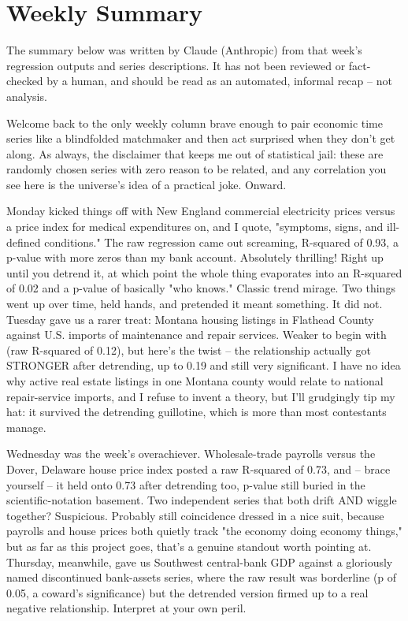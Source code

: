 \section{Weekly Summary}

\begin{tcolorbox}[colback=yellow!10,colframe=black!50,title=AI-Generated Content]
\noindent The summary below was written by Claude (Anthropic) from that week's regression outputs and series descriptions. It has not been reviewed or fact-checked by a human, and should be read as an automated, informal recap -- not analysis.
\end{tcolorbox}

Welcome back to the only weekly column brave enough to pair economic time series like a blindfolded matchmaker and then act surprised when they don't get along. As always, the disclaimer that keeps me out of statistical jail: these are randomly chosen series with zero reason to be related, and any correlation you see here is the universe's idea of a practical joke. Onward.

Monday kicked things off with New England commercial electricity prices versus a price index for medical expenditures on, and I quote, "symptoms, signs, and ill-defined conditions." The raw regression came out screaming, R-squared of 0.93, a p-value with more zeros than my bank account. Absolutely thrilling! Right up until you detrend it, at which point the whole thing evaporates into an R-squared of 0.02 and a p-value of basically "who knows." Classic trend mirage. Two things went up over time, held hands, and pretended it meant something. It did not. Tuesday gave us a rarer treat: Montana housing listings in Flathead County against U.S. imports of maintenance and repair services. Weaker to begin with (raw R-squared of 0.12), but here's the twist -- the relationship actually got STRONGER after detrending, up to 0.19 and still very significant. I have no idea why active real estate listings in one Montana county would relate to national repair-service imports, and I refuse to invent a theory, but I'll grudgingly tip my hat: it survived the detrending guillotine, which is more than most contestants manage.

Wednesday was the week's overachiever. Wholesale-trade payrolls versus the Dover, Delaware house price index posted a raw R-squared of 0.73, and -- brace yourself -- it held onto 0.73 after detrending too, p-value still buried in the scientific-notation basement. Two independent series that both drift AND wiggle together? Suspicious. Probably still coincidence dressed in a nice suit, because payrolls and house prices both quietly track "the economy doing economy things," but as far as this project goes, that's a genuine standout worth pointing at. Thursday, meanwhile, gave us Southwest central-bank GDP against a gloriously named discontinued bank-assets series, where the raw result was borderline (p of 0.05, a coward's significance) but the detrended version firmed up to a real negative relationship. Interpret at your own peril.

